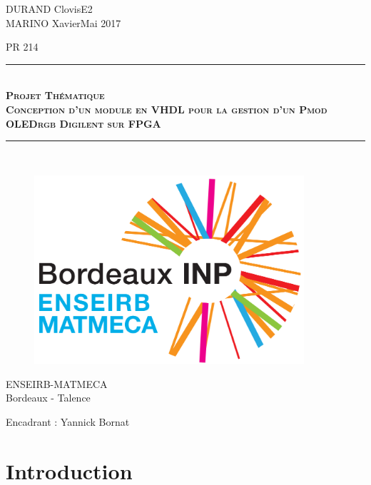 \documentclass[11pt]{article}
\newcommand{\HRule}{\rule{\linewidth}{0.5mm}}
\begin{document}
\thispagestyle{empty}

\noindent 
DURAND Clovis\hfill{E2} \\ MARINO Xavier\hfill{Mai 2017}



\vspace{1cm}
\begin{center}
\Large{PR 214} %
\HRule \\[0.1cm]
{\textsc{\LARGE \textbf{Projet Thématique\\ Conception d'un module en VHDL pour la gestion d'un Pmod OLEDrgb Digilent sur FPGA}}}\\
\HRule\\[01cm]
\end{center}
\vspace{1cm}

\begin{figure}[htbp]
\begin{center}
\includegraphics[width=10cm]{background.png}
\end{center}
\end{figure}

\vspace{0.5cm}
\begin{center}
\Large{ENSEIRB-MATMECA \\ Bordeaux - Talence}
\end{center}

\vspace{0.5cm}
Encadrant : Yannick Bornat

\newpage
\tableofcontents
\newpage
\listoffigures
\newpage 

\setcounter{section}{-1}

\section{Introduction}
\end{document}
